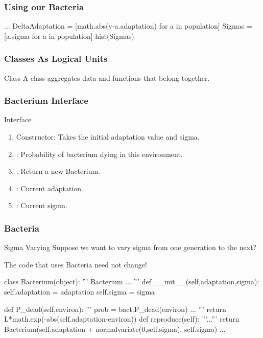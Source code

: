\begin{frame}[fragile] 
\frametitle{Using our Bacteria}

\begin{python}
...
DeltaAdaptation = [math.abs(y-a.adaptation) 
                    for a in population]
Sigmas = [a.sigma for a in population]
hist(Sigmas)
\end{python}

\end{frame}

\begin{frame}[fragile] 
\frametitle{Classes As Logical Units}
\begin{block}{Class}
A class aggregates data and functions that belong together.
\end{block}
\end{frame}

\begin{frame}[fragile] 
\frametitle{Bacterium Interface}

\begin{block}{Interface}
\begin{enumerate}
\item Constructor: Takes the initial adaptation value and sigma.
\item {}: Probability of bacterium dying in this environment.
\item {}: Return a new Bacterium.
\item {}: Current adaptation.
\item {}: Current sigma.
\end{enumerate}
\end{block}
\end{frame}

\begin{frame}[fragile] 
\frametitle{Bacteria}
\begin{block}{Sigma Varying}
Suppose we want to vary sigma from one generation to the next?
\end{block}

The \alert{code that uses Bacteria} need not change!
\end{frame}

\begin{frame}[fragile] 

\begin{python}
class Bacterium(object):
    '''
    Bacterium
    ...
    '''
    def __init__(self,adaptation,sigma):
        self.adaptation = adaptation
        self.sigma = sigma
    
    def P_dead(self,environ):
        '''
        prob = bact.P_dead(environ)
        ...
        '''
        return L*math.exp(-abs(self.adaptation-environ))
    def reproduce(self):
        '''...'''
        return Bacterium(self.adaptation +
                             normalvariate(0,self.sigma),
                             self.sigma)
    ...
\end{python}
\end{frame}

